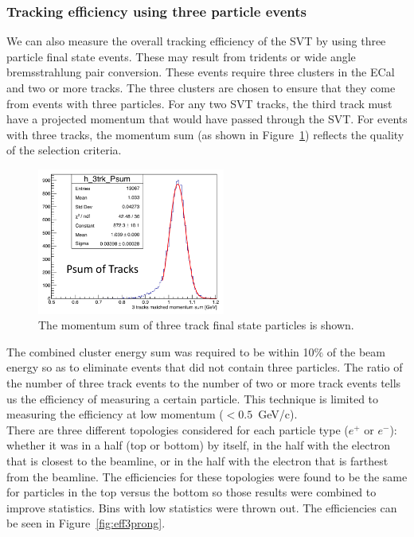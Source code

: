 \subsubsection{Tracking efficiency using three particle events}
We can also measure the overall tracking efficiency of the SVT by using three particle final state events. These may result from tridents or wide angle bremsstrahlung pair conversion. These events require three clusters in the ECal and two or more tracks. The three clusters are chosen to ensure that they come from events with three particles. For any two SVT tracks, the third track must have a projected momentum that would have passed through the SVT. For events with three tracks, the momentum sum (as shown in Figure~\ref{Figure:psumtrks}) reflects the quality of the selection criteria. 
\begin{figure}[thb]
  \centering
      \includegraphics[width=0.55\textwidth]{pics/performance/pSum_3trk.png}
  \caption[Momentum sum of three track final state particles]{The momentum sum of three track final state particles is shown.}
  \label{Figure:psumtrks}
\end{figure}

The combined cluster energy sum was required to be within 10$\%$ of the beam energy so as to eliminate events that did not contain three particles. The ratio of the number of three track events to the number of two or more track events tells us the efficiency of measuring a certain particle. This technique is limited to measuring the efficiency at low momentum ($<0.5$~GeV/c).\\
\indent There are three different topologies considered for each particle type ($e^+$ or $e^-$): whether it was in a half (top or bottom) by itself, in the half with the electron that is closest to the beamline, or in the half with the electron that is farthest from the beamline. The efficiencies for these topologies were found to be the same for particles in the top versus the bottom so those results were combined to improve statistics. Bins with low statistics were thrown out. The efficiencies can be seen in Figure~\ref{fig:eff3prong}.


